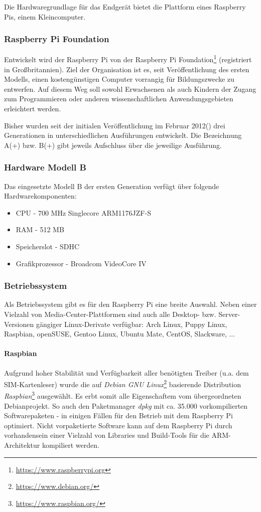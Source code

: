 Die Hardwaregrundlage für das Endgerät bietet die Plattform eines Raspberry Pis, einem Kleincomputer.

\subsubsection{Raspberry Pi Foundation}
Entwickelt wird der Raspberry Pi von der Raspberry Pi Foundation\footnote{\url{https://www.raspberrypi.org}}
(registriert in Großbritannien). Ziel der Organisation ist es,
seit Veröffentlichung des ersten Modells, einen kostengünstigen
Computer vorrangig für Bildungszwecke zu entwerfen. Auf diesem
Weg soll sowohl Erwachsenen als auch Kindern der Zugang zum
Programmieren oder anderen wissenschaftlichen Anwendungsgebieten
erleichtert werden.

Bisher wurden seit der initialen Veröffentlichung im Februar 2012(\cite{rasppifoundweb})
drei Generationen in unterschiedlichen Ausführungen
entwickelt. Die Bezeichnung A(+) bzw. B(+) gibt jeweils Aufschluss
über die jeweilige Ausführung.

\subsubsection{Hardware Modell B}
Das eingesetzte Modell B der ersten Generation verfügt über folgende Hardwarekomponenten:
\begin{itemize}
\item CPU - 700 MHz Singlecore ARM1176JZF-S
\item RAM - 512 MB
\item Speicherslot - SDHC
\item Grafikprozessor - Broadcom VideoCore IV
\end{itemize}

\subsubsection{Betriebssystem}
Als Betriebssystem gibt es für den Raspberry Pi eine breite Auswahl.
Neben einer Vielzahl von Media-Center-Plattformen sind auch alle
Desktop- bzw. Server-Versionen gängiger Linux-Derivate verfügbar:
Arch Linux, Puppy Linux, Raspbian, openSUSE, Gentoo Linux, Ubuntu Mate,
CentOS, Slackware, ...

\paragraph{Raspbian}
Aufgrund hoher Stabilität und Verfügbarkeit aller benötigten Treiber
(u.a. dem SIM-Kartenleser) wurde die auf \textit{Debian GNU Linux}\footnote{\url{https://www.debian.org/}}
basierende Distribution \textit{Raspbian}\footnote{\url{https://www.raspbian.org/}} ausgewählt.
Es erbt somit alle Eigenschaftem vom übergeordneten Debianprojekt.
So auch den Paketmanager \textit{dpkg} mit ca. 35.000 vorkompilierten
Softwarepaketen - in einigen Fällen für den Betrieb mit dem
Raspberry Pi optimiert. Nicht vorpaketierte Software kann auf dem Raspberry
Pi durch vorhandensein einer Vielzahl von Libraries und Build-Tools
für die ARM-Architektur kompiliert werden.

